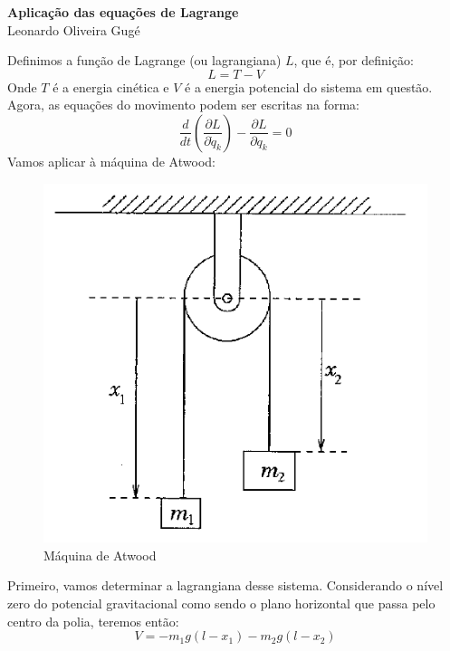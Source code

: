 \documentclass{article}
\begin{document}
\begin{center}
    \textbf{\huge{Aplicação das equações de Lagrange}} 
    \\
    Leonardo Oliveira Gugé
\end{center}
Definimos a função de Lagrange (ou lagrangiana) $L$, que é,
por definição:
\begin{equation}
    L=T-V
\end{equation}
Onde $T$ é a energia cinética e $V$ é a energia 
potencial do sistema em questão.
Agora, as equações do movimento podem ser escritas na forma:
\begin{equation}
    \frac{d}{dt}(\frac{\partial L}{\partial \dot{q}_k})-
    \frac{\partial L}{\partial q_k}=0
\end{equation}
Vamos aplicar à máquina de Atwood:
\begin{center}
    
\begin{figure}[h]
    \centering
    \includegraphics[scale=0.5]{Atwood}
    \caption{Máquina de Atwood}
\end{figure}

\end{center}
Primeiro, vamos determinar a lagrangiana desse sistema. Considerando
o nível zero do potencial gravitacional como sendo o plano horizontal
que passa pelo centro da polia, teremos então:
\begin{equation}
    V=-m_1g(l-x_1)-m_2g(l-x_2) 
\end{equation}
\end{document}
